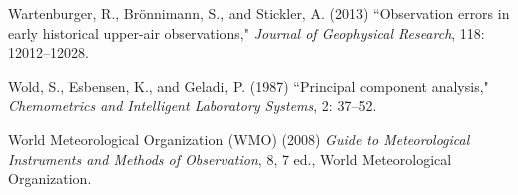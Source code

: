 \documentclass[12pt]{article}
\def\refhg{\hangindent=20pt\hangafter=1}
\def\refmark{\par\vskip 2mm\noindent\refhg}
\def\refhg{\hangindent=20pt\hangafter=1}
\def\refmark{\par\vskip 2mm\noindent\refhg}
\begin{document}
\refmark Wartenburger, R., Br\"{o}nnimann, S., and Stickler, A. (2013) ``Observation errors in early historical upper-air observations," \emph{Journal of Geophysical Research}, 118: 12012--12028.

\refmark Wold, S., Esbensen, K., and Geladi, P. (1987) ``Principal component analysis," \emph{Chemometrics and Intelligent Laboratory Systems}, 2: 37--52.

\refmark World Meteorological Organization (WMO) (2008) \emph{Guide to Meteorological Instruments and Methods of Observation}, 8, 7 ed., World Meteorological Organization.



\clearpage


\end{document}
